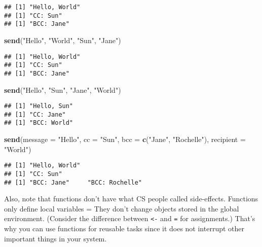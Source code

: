 \documentclass[
]{book}
\newenvironment{Shaded}{\begin{snugshade}}{\end{snugshade}}
\newcommand{\DataTypeTok}[1]{\textcolor[rgb]{0.13,0.29,0.53}{#1}}
\newcommand{\KeywordTok}[1]{\textcolor[rgb]{0.13,0.29,0.53}{\textbf{#1}}}
\newcommand{\NormalTok}[1]{#1}
\newcommand{\StringTok}[1]{\textcolor[rgb]{0.31,0.60,0.02}{#1}}
\begin{document}
\begin{verbatim}
## [1] "Hello, World"
## [1] "CC: Sun"
## [1] "BCC: Jane"
\end{verbatim}

\begin{Shaded}
\begin{Highlighting}[]
\KeywordTok{send}\NormalTok{(}\StringTok{"Hello"}\NormalTok{, }\StringTok{"World"}\NormalTok{, }\StringTok{"Sun"}\NormalTok{, }\StringTok{"Jane"}\NormalTok{)}
\end{Highlighting}
\end{Shaded}

\begin{verbatim}
## [1] "Hello, World"
## [1] "CC: Sun"
## [1] "BCC: Jane"
\end{verbatim}

\begin{Shaded}
\begin{Highlighting}[]
\KeywordTok{send}\NormalTok{(}\StringTok{"Hello"}\NormalTok{, }\StringTok{"Sun"}\NormalTok{, }\StringTok{"Jane"}\NormalTok{, }\StringTok{"World"}\NormalTok{)}
\end{Highlighting}
\end{Shaded}

\begin{verbatim}
## [1] "Hello, Sun"
## [1] "CC: Jane"
## [1] "BCC: World"
\end{verbatim}

\begin{Shaded}
\begin{Highlighting}[]
\KeywordTok{send}\NormalTok{(}\DataTypeTok{message =} \StringTok{"Hello"}\NormalTok{, }\DataTypeTok{cc =} \StringTok{"Sun"}\NormalTok{, }\DataTypeTok{bcc =} \KeywordTok{c}\NormalTok{(}\StringTok{"Jane"}\NormalTok{, }\StringTok{"Rochelle"}\NormalTok{), }\DataTypeTok{recipient =} \StringTok{"World"}\NormalTok{)}
\end{Highlighting}
\end{Shaded}

\begin{verbatim}
## [1] "Hello, World"
## [1] "CC: Sun"
## [1] "BCC: Jane"     "BCC: Rochelle"
\end{verbatim}

Also, note that functions don't have what CS people called side-effects. Functions only define local variables = They don't change objects stored in the global environment. (Consider the difference between \texttt{\textless{}-} and \texttt{=} for assignments.) That's why you can use functions for reusable tasks since it does not interrupt other important things in your system.
\end{document}

